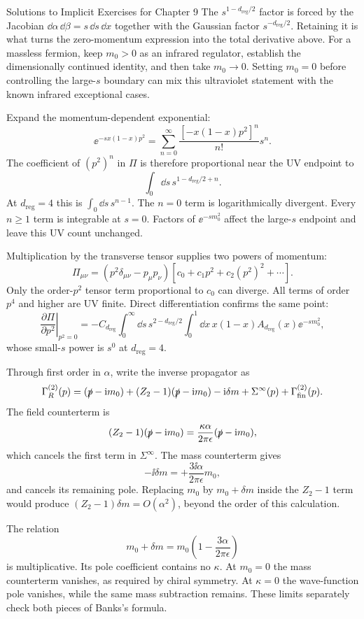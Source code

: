 \begin{bankssolutions}{Solutions to Implicit Exercises for Chapter 9}
The $s^{1-d_{\mathrm{reg}}/2}$ factor is forced by the Jacobian
$\dd\alpha\,\dd\beta=s\,\dd s\,\dd x$ together with the Gaussian factor
$s^{-d_{\mathrm{reg}}/2}$.  Retaining it is what turns the zero-momentum expression into the
total derivative above.  For a massless fermion, keep $m_0>0$ as an infrared
regulator, establish the dimensionally continued identity, and then take
$m_0\to0$.  Setting $m_0=0$ before controlling the large-$s$ boundary can
mix this ultraviolet statement with the known infrared exceptional cases.

Expand the momentum-dependent exponential:
\[
  \ee^{-sx(1-x)p^2}
  =\sum_{n=0}^\infty\frac{[-x(1-x)p^2]^n}{n!}s^n.
\]
The coefficient of $(p^2)^n$ in $\Pi$ is therefore proportional near the UV
endpoint to
\[
  \int_0\dd s\,s^{1-d_{\mathrm{reg}}/2+n}.
\]
At $d_{\mathrm{reg}}=4$ this is $\int_0\dd s\,s^{n-1}$.  The $n=0$ term is logarithmically
divergent.  Every $n\geq1$ term is integrable at $s=0$.  Factors of
$\ee^{-sm_0^2}$ affect the large-$s$ endpoint and leave this UV count
unchanged.

Multiplication by the transverse tensor supplies two powers of momentum:
\[
  \Pi_{\mu\nu}=(p^2\delta_{\mu\nu}-p_\mu p_\nu)
  [c_0+c_1p^2+c_2(p^2)^2+\cdots].
\]
Only the order-$p^2$ tensor term proportional to $c_0$ can diverge.  All terms
of order $p^4$ and higher are UV finite.  Direct differentiation confirms the
same point:
\[
  \left.\frac{\partial\Pi}{\partial p^2}\right|_{p^2=0}
  =-C_{d_{\mathrm{reg}}}\int_0^\infty\dd s\,s^{2-d_{\mathrm{reg}}/2}\int_0^1\dd x\,
  x(1-x)A_{d_{\mathrm{reg}}}(x)\ee^{-sm_0^2},
\]
whose small-$s$ power is $s^0$ at $d_{\mathrm{reg}}=4$.

Through first order in $\alpha$, write the inverse propagator as
\[
  \Gamma_R^{(2)}(p)=
  (\slashed p-\mathrm{i} m_0)
  +(Z_2-1)(\slashed p-\mathrm{i} m_0)
  -\mathrm{i}\delta m+\Sigma^\infty(p)+\Gamma_{\mathrm{fin}}^{(2)}(p).
\]
The field counterterm is
\[
  (Z_2-1)(\slashed p-\mathrm{i} m_0)
  =\frac{\kappa\alpha}{2\pi\epsilon}
  (\slashed p-\mathrm{i} m_0),
\]
which cancels the first term in $\Sigma^\infty$.  The mass counterterm gives
\[
  -\ii\delta m=+\frac{3\ii\alpha}{2\pi\epsilon}m_0,
\]
and cancels its remaining pole.  Replacing $m_0$ by $m_0+\delta m$ inside the
$Z_2-1$ term would produce $(Z_2-1)\delta m=O(\alpha^2)$, beyond the order of
this calculation.

The relation
\[
  m_0+\delta m=m_0
  \left(1-\frac{3\alpha}{2\pi\epsilon}\right)
\]
is multiplicative.  Its pole coefficient contains no $\kappa$.  At $m_0=0$
the mass counterterm vanishes, as required by chiral symmetry.  At
$\kappa=0$ the wave-function pole vanishes, while the same mass subtraction
remains.  These limits separately check both pieces of Banks's formula.


\end{bankssolutions}
